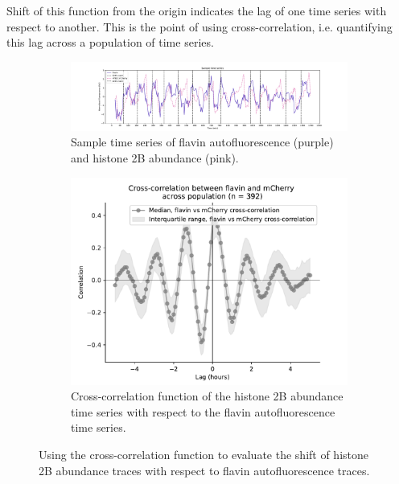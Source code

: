 Shift of this function from the origin indicates the lag of one time series with respect to another.  This is the point of using cross-correlation, i.e. quantifying this lag across a population of time series.

\begin{figure}
  \centering
  \begin{subfigure}[t]{0.9\textwidth}
  \centering
    \includegraphics[width=\linewidth]{htb2mCherry_26643_plots_purple_01.pdf}
    \caption{
      Sample time series of flavin autofluorescence (purple) and histone 2B abundance (pink).
    }
    \label{fig:xcf-biol-ts}
  \end{subfigure}

  \begin{subfigure}[t]{0.7\textwidth}
  \centering
    \includegraphics[width=\linewidth]{xcf.pdf}
    \caption{
      Cross-correlation function of the histone 2B abundance time series with respect to the flavin autofluorescence time series.
    }
    \label{fig:xcf-biol}
  \end{subfigure}

  \caption{
    Using the cross-correlation function to evaluate the shift of histone 2B abundance traces with respect to flavin autofluorescence traces.
  }
  \label{fig:xcf}
\end{figure}

